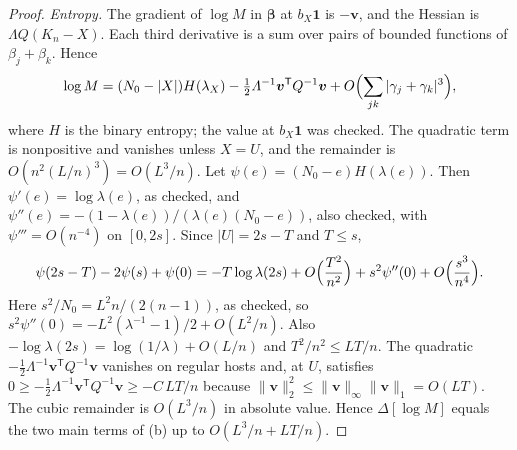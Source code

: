 \documentclass[11pt]{article}
\begin{document}
\begin{proof}
\emph{Entropy.}
The gradient of \(\log M\) in \(\boldsymbol\beta\) at \(b_X\mathbf1\) is
\(-\boldsymbol v\), and the Hessian is \(\varLambda Q(K_n-X)\).
Each third derivative is a sum over pairs of bounded functions of
\(\beta_j+\beta_k\). Hence
\[
\log M=(N_0-|X|)H(\lambda_X)-\tfrac12\varLambda^{-1}\boldsymbol v^{\mathsf T}Q^{-1}\boldsymbol v
+O\Bigl(\sum_{jk}|\gamma_j+\gamma_k|^3\Bigr),
\]
where \(H\) is the binary entropy; the value at \(b_X\mathbf 1\) was checked.
The quadratic term is nonpositive and vanishes unless \(X=U\), and the
remainder is \(O(n^2(L/n)^3)=O(L^3/n)\).
Let \(\psi(e)=(N_0-e)H(\lambda(e))\).
Then \(\psi'(e)=\log\lambda(e)\), as checked, and
\(\psi''(e)=-(1-\lambda(e))/(\lambda(e)(N_0-e))\), also checked, with
\(\psi'''=O(n^{-4})\) on \([0,2s]\).
Since \(|U|=2s-T\) and \(T\le s\),
\[
\psi(2s-T)-2\psi(s)+\psi(0)
=-T\log\lambda(2s)+O\Bigl(\frac{T^2}{n^2}\Bigr)+s^2\psi''(0)+O\Bigl(\frac{s^3}{n^4}\Bigr).
\]
Here \(s^2/N_0=L^2n/(2(n-1))\), as checked, so
\(s^2\psi''(0)=-L^2(\lambda^{-1}-1)/2+O(L^2/n)\).
Also \(-\log\lambda(2s)=\log(1/\lambda)+O(L/n)\) and \(T^2/n^2\le LT/n\).
The quadratic \(-\tfrac12\varLambda^{-1}\boldsymbol v^{\mathsf T}Q^{-1}\boldsymbol v\)
vanishes on regular hosts and, at \(U\), satisfies
\(0\ge-\tfrac12\varLambda^{-1}\boldsymbol v^{\mathsf T}Q^{-1}\boldsymbol v
\ge -C\,LT/n\) because \(\|\boldsymbol v\|_2^2\le\|\boldsymbol v\|_\infty\|\boldsymbol v\|_1
=O(LT)\). The cubic remainder is \(O(L^3/n)\) in absolute value.
Hence \(\Delta[\log M]\) equals the two main terms of (b) up to
\(O(L^3/n+LT/n)\).


\end{proof}
\end{document}

